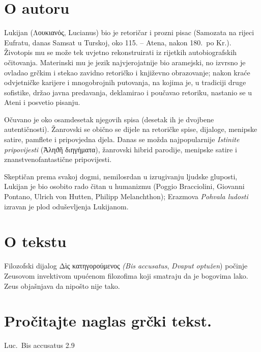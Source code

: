 \section*{O autoru}

Lukijan \textgreek[variant=ancient]{(Λουκιανός,} Lucianus) bio je retoričar i prozni pisac (Samozata na rijeci Eufratu, danas Samsat u Turskoj, oko 115. – Atena, nakon 180.\ po Kr.). Životopis mu se može tek uvjetno rekonstruirati iz rijetkih autobiografskih očitovanja. Materinski mu je jezik najvjerojatnije bio aramejski, no izvrsno je ovladao grčkim i stekao zavidno retoričko i književno obrazovanje; nakon kraće odvjetničke karijere i mnogobrojnih putovanja, na kojima je, u tradiciji druge sofistike, držao javna predavanja, deklamirao i poučavao retoriku, nastanio se u Ateni i posvetio pisanju.

Očuvano je oko osamdesetak njegovih spisa (desetak ih je dvojbene autentičnosti). Žanrovski se obično se dijele na retoričke spise, dijaloge, menipske satire, pamflete i pripovjedna djela. Danas se možda najpopularnije \textit{Istinite pripovijesti} \textgreek[variant=ancient]{(Ἀληϑῆ δıηγήματα),} žanrovski hibrid parodije, menipske satire i znanstvenofantastične pripovijesti.

Skeptičan prema svakoj dogmi, nemilosrdan u izrugivanju ljudske gluposti, Lukijan je bio osobito rado čitan u humanizmu (Poggio Bracciolini, Giovanni Pontano, Ulrich von Hutten, Philipp Melanchthon); Erazmova \textit{Pohvala ludosti} izravan je plod oduševljenja Lukijanom.

\section*{O tekstu}

Filozofski dijalog \textgreek[variant=ancient]{Δὶς κατηγορούμενος} \textit{(Bis accusatus}, \textit{Dvaput optužen}) počinje Zeusovom invektivom upućenom filozofima koji smatraju da je bogovima lako. Zeus objašnjava da nipošto nije tako.

\newpage

\section*{Pročitajte naglas grčki tekst.}

Luc.\ Bis accusatus 2.9

\medskip

